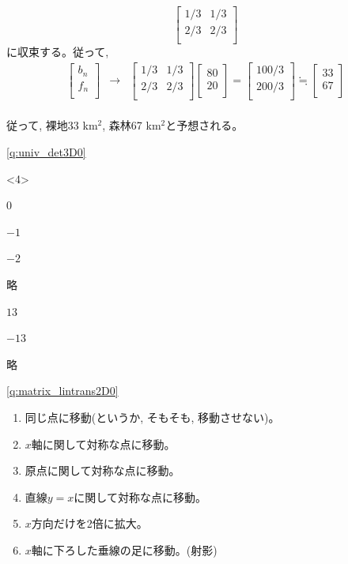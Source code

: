 \begin{enumerate}
\begin{equation}
\begin{bmatrix}
1/3 & 1/3\\
2/3 & 2/3\\
\end{bmatrix}
\end{equation}
に収束する。従って, \\
\begin{eqnarray*}
\begin{bmatrix}
b_n\\
f_n\\
\end{bmatrix}
&\rightarrow&
\begin{bmatrix}
1/3 & 1/3\\
2/3 & 2/3\\
\end{bmatrix}
\begin{bmatrix}
80\\
20\\
\end{bmatrix}
=\begin{bmatrix}
100/3\\
200/3\\
\end{bmatrix}
\fallingdotseq\begin{bmatrix}
33\\
67\\
\end{bmatrix}
\end{eqnarray*}
\\従って, 裸地33$\,\,$km$^2$, 森林67$\,\,$km$^2$と予想される。
\end{enumerate}

\ref{q:univ_det3D0}  
\begin{edaenumerate}<4>
\item 0
\item $-1$
\item $-2$
\item 略  %
\item $13$
\item $-13$
\item 略 %
\end{edaenumerate}


\ref{q:matrix_lintrans2D0}  
\begin{enumerate}
\item 同じ点に移動(というか, そもそも, 移動させない)。
\item $x$軸に関して対称な点に移動。
\item 原点に関して対称な点に移動。 
\item 直線$y=x$に関して対称な点に移動。
\item $x$方向だけを2倍に拡大。
\item $x$軸に下ろした垂線の足に移動。(射影)
\end{enumerate}
\mv

